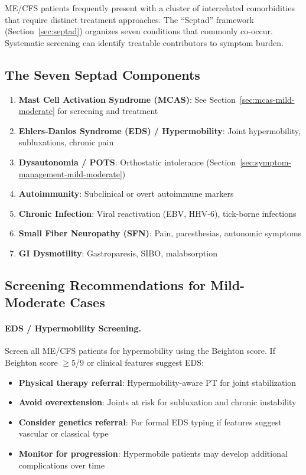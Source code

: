 ME/CFS patients frequently present with a cluster of interrelated comorbidities that require distinct treatment approaches. The ``Septad'' framework (Section~\ref{sec:septad}) organizes seven conditions that commonly co-occur. Systematic screening can identify treatable contributors to symptom burden.

\subsection{The Seven Septad Components}

\begin{enumerate}
    \item \textbf{Mast Cell Activation Syndrome (MCAS)}: See Section~\ref{sec:mcas-mild-moderate} for screening and treatment
    \item \textbf{Ehlers-Danlos Syndrome (EDS) / Hypermobility}: Joint hypermobility, subluxations, chronic pain
    \item \textbf{Dysautonomia / POTS}: Orthostatic intolerance (Section~\ref{sec:symptom-management-mild-moderate})
    \item \textbf{Autoimmunity}: Subclinical or overt autoimmune markers
    \item \textbf{Chronic Infection}: Viral reactivation (EBV, HHV-6), tick-borne infections
    \item \textbf{Small Fiber Neuropathy (SFN)}: Pain, paresthesias, autonomic symptoms
    \item \textbf{GI Dysmotility}: Gastroparesis, SIBO, malabsorption
\end{enumerate}

\subsection{Screening Recommendations for Mild-Moderate Cases}

\paragraph{EDS / Hypermobility Screening.}
Screen all ME/CFS patients for hypermobility using the Beighton score. If Beighton score $\geq$5/9 or clinical features suggest EDS:

\begin{itemize}
    \item \textbf{Physical therapy referral}: Hypermobility-aware PT for joint stabilization
    \item \textbf{Avoid overextension}: Joints at risk for subluxation and chronic instability
    \item \textbf{Consider genetics referral}: For formal EDS typing if features suggest vascular or classical type
    \item \textbf{Monitor for progression}: Hypermobile patients may develop additional complications over time
\end{itemize}

